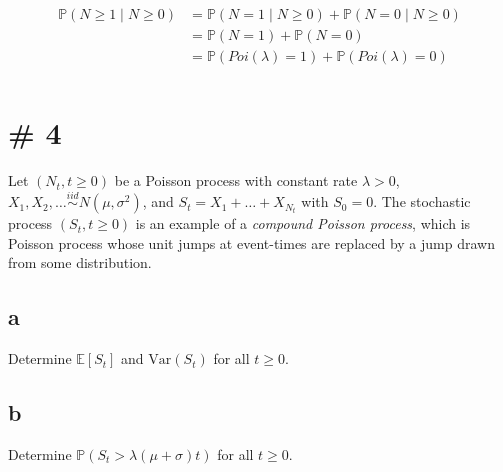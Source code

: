 \documentclass{article}
\newcommand{\prob}{\mathbb{P}}
\newcommand{\expect}{\mathbb{E}}
\newcommand{\var}{\text{Var}}
\begin{document}
\begin{align*}
    \prob(N \geq 1 \;|\; N \geq 0)
    &= \prob(N = 1 \;|\; N \geq 0) + \prob(N = 0 \;|\; N \geq 0) \\
    &= \prob(N = 1) + \prob(N = 0) \\
    &= \prob(Poi(\lambda) = 1) + \prob(Poi(\lambda) = 0) \\
\end{align*}

\section{\# 4}
Let $(N_t, t \geq 0)$ be a Poisson process with constant rate $\lambda > 0$,
$X_1, X_2, \ldots \overset{iid}{\sim} N(\mu, \sigma^2)$, and 
$S_t = X_1 + \ldots + X_{N_t}$ with $S_0 = 0$. The stochastic process
$(S_t, t \geq 0)$ is an example of a \textit{compound Poisson process}, which is
Poisson process whose unit jumps at event-times are replaced by a jump drawn
from some distribution.

\subsection{a}
Determine $\expect[S_t]$ and $\var(S_t)$ for all $t \geq 0$.

\subsection{b}
Determine $\prob(S_t > \lambda(\mu + \sigma)t)$ for all $t \geq 0$.
\end{document}
